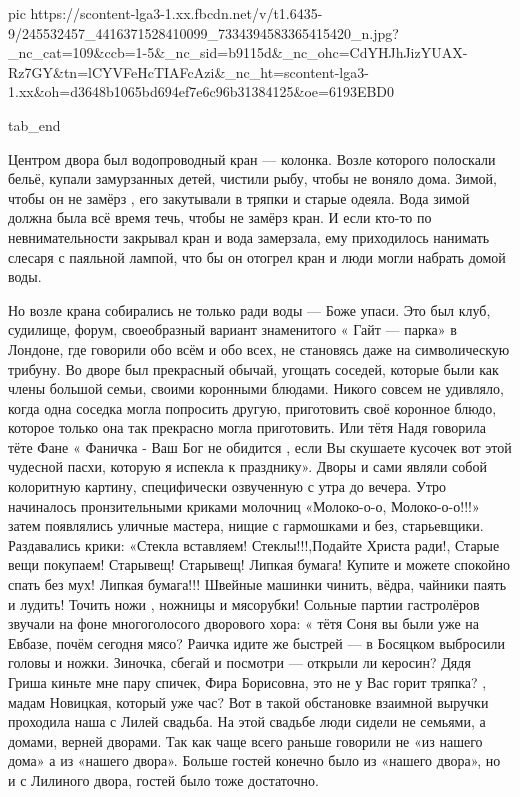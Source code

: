      pic https://scontent-lga3-1.xx.fbcdn.net/v/t1.6435-9/245532457_4416371528410099_7334394583365415420_n.jpg?_nc_cat=109&ccb=1-5&_nc_sid=b9115d&_nc_ohc=CdYHJhJizYUAX-Rz7GY&tn=lCYVFeHcTIAFcAzi&_nc_ht=scontent-lga3-1.xx&oh=d3648b1065bd694ef7e6c96b31384125&oe=6193EBD0

  tab_end
\fi

Центром двора  был водопроводный кран — колонка. Возле которого полоскали
бельё, купали замурзанных детей, чистили рыбу, чтобы не воняло дома. Зимой,
чтобы он не замёрз , его закутывали в  тряпки  и старые одеяла. Вода зимой
должна была всё время течь, чтобы не замёрз кран. И если кто-то по
невнимательности закрывал кран и вода замерзала, ему приходилось нанимать
слесаря с паяльной лампой, что бы он отогрел кран и люди могли набрать домой
воды.

Но возле крана собирались не только ради воды — Боже упаси. Это был клуб,
судилище, форум, своеобразный вариант знаменитого « Гайт — парка» в Лондоне,
где говорили обо всём и обо всех, не становясь даже на символическую трибуну.
Во дворе был прекрасный обычай, угощать соседей, которые были как члены большой
семьи, своими коронными блюдами. Никого совсем не удивляло, когда одна соседка
могла попросить другую, приготовить своё коронное блюдо, которое только она так
прекрасно могла приготовить. Или тётя Надя говорила тёте Фане « Фаничка - Ваш
Бог не обидится , если Вы скушаете кусочек вот этой чудесной пасхи, которую я
испекла к празднику». Дворы и сами являли собой колоритную картину,
специфически озвученную с утра до вечера. Утро начиналось пронзительными
криками молочниц «Молоко-о-о, Молоко-о-о!!!» затем появлялись уличные мастера,
нищие с гармошками и без, старьевщики. Раздавались крики: «Стекла вставляем!
Стеклы!!!,Подайте Христа ради!, Старые вещи покупаем! Старывещ! Старывещ!
Липкая бумага! Купите и можете спокойно спать без мух! Липкая бумага!!! Швейные
машинки чинить, вёдра, чайники паять и лудить! Точить ножи , ножницы и
мясорубки! Сольные партии гастролёров звучали на фоне многоголосого дворового
хора: « тётя Соня вы были уже на Евбазе, почём сегодня мясо? Раичка идите же
быстрей — в Босяцком выбросили  головы и ножки. Зиночка, сбегай и посмотри —
открыли ли керосин? Дядя Гриша киньте мне пару спичек, Фира Борисовна, это не у
Вас горит тряпка? , мадам Новицкая, который уже час?   Вот в такой обстановке
взаимной выручки проходила наша с Лилей свадьба.  На этой свадьбе  люди сидели
не семьями, а домами, верней дворами. Так как чаще всего раньше говорили  не
«из нашего дома» а из «нашего двора». Больше  гостей конечно было из «нашего
двора», но и с Лилиного двора, гостей было тоже достаточно.

